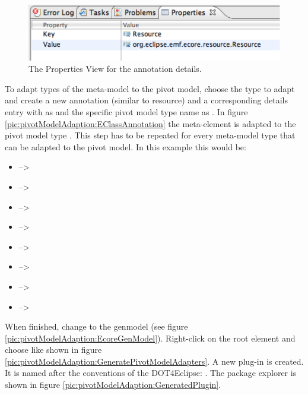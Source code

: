 \begin{figure}[!htbp]
	\centering
	\includegraphics[width=1.0\linewidth]{figures/pivotModelAdaption/AnnotationDetailsProperties}
	\caption{The Properties View for the annotation details.}
	\label{pic:pivotModelAdaption:AnnotationDetailsProperties}
\end{figure}

To adapt types of the meta-model to the pivot model, choose the type to adapt and create a new annotation (similar to resource) and a corresponding details entry with  as  and the specific pivot model type name as . In figure \ref{pic:pivotModelAdaption:EClassAnnotation} the meta-element  is adapted to the pivot model type . This step has to be repeated for every meta-model type that can be adapted to the pivot model. In this example this would be:
\begin{itemize}
\item {} --\textgreater {}
\item {} --\textgreater {}
\item {} --\textgreater {}
\item {} --\textgreater {}
\item {} --\textgreater {}
\item {} --\textgreater {}
\item {} --\textgreater {}
\item {} --\textgreater {}
\end{itemize}

When finished, change to the genmodel (see figure \ref{pic:pivotModelAdaption:EcoreGenModel}). Right-click on the root element and choose  like shown in figure \ref{pic:pivotModelAdaption:GeneratePivotModelAdapters}. A new plug-in is created. It is named after the conventions of the \acl{DOT4Eclipse}: . The package explorer is shown in figure \ref{pic:pivotModelAdaption:GeneratedPlugin}.

